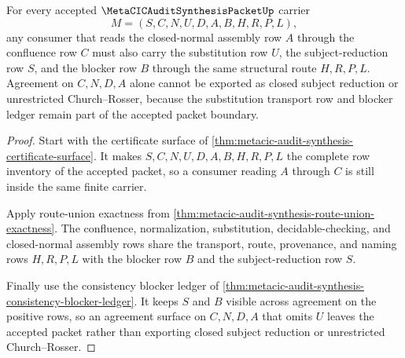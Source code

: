 \begin{theorem}
\label{thm:metacic-audit-synthesis-substitution-confluence-join}
For every accepted $\MetaCICAuditSynthesisPacketUp$ carrier
$$
M=(S,C,N,U,D,A,B,H,R,P,L),
$$
any consumer that reads the closed-normal assembly row $A$ through the confluence row $C$ must also carry the substitution row $U$, the subject-reduction row $S$, and the blocker row $B$ through the same structural route $H,R,P,L$. Agreement on $C,N,D,A$ alone cannot be exported as closed subject reduction or unrestricted Church--Rosser, because the substitution transport row and blocker ledger remain part of the accepted packet boundary.
\end{theorem}
\begin{proof}
Start with the certificate surface of \autoref{thm:metacic-audit-synthesis-certificate-surface}. It makes $S,C,N,U,D,A,B,H,R,P,L$ the complete row inventory of the accepted packet, so a consumer reading $A$ through $C$ is still inside the same finite carrier.

Apply route-union exactness from \autoref{thm:metacic-audit-synthesis-route-union-exactness}. The confluence, normalization, substitution, decidable-checking, and closed-normal assembly rows share the transport, route, provenance, and naming rows $H,R,P,L$ with the blocker row $B$ and the subject-reduction row $S$.

Finally use the consistency blocker ledger of \autoref{thm:metacic-audit-synthesis-consistency-blocker-ledger}. It keeps $S$ and $B$ visible across agreement on the positive rows, so an agreement surface on $C,N,D,A$ that omits $U$ leaves the accepted packet rather than exporting closed subject reduction or unrestricted Church--Rosser.
\end{proof}

